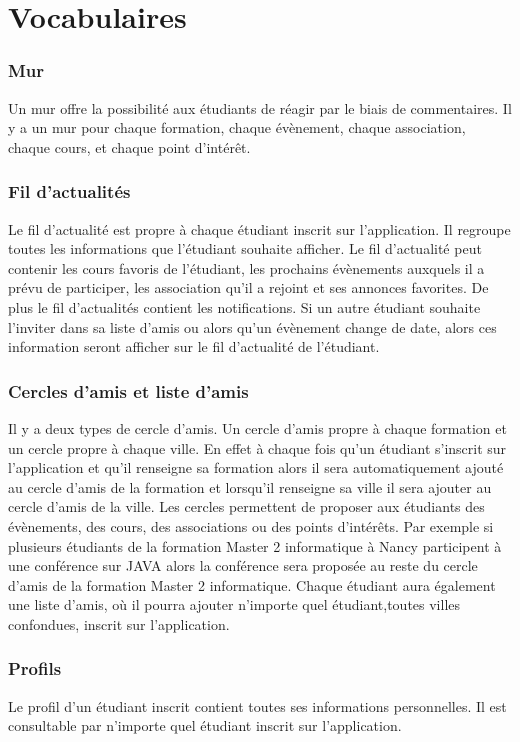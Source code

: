 \section*{Vocabulaires}
\subsubsection*{Mur}
Un mur offre la possibilité aux étudiants de réagir par le biais de commentaires. Il y a un mur pour chaque formation, chaque évènement, chaque association, chaque cours, et chaque point d’intérêt. 
\subsubsection*{Fil d’actualités}
Le fil d’actualité est propre à chaque étudiant inscrit sur l'application. Il regroupe toutes les informations que l’étudiant souhaite afficher. Le fil d’actualité peut contenir les cours favoris de l'étudiant, les prochains évènements auxquels il a prévu de participer, les association qu’il a rejoint et ses annonces favorites. De plus le fil d’actualités contient les notifications. Si un autre étudiant souhaite l’inviter dans sa liste d’amis ou alors qu’un évènement change de date, alors ces information seront afficher sur le fil d’actualité de l’étudiant. 
\subsubsection*{Cercles d’amis et liste d’amis}
Il y a deux types de cercle d’amis. Un cercle d’amis propre à chaque formation et un cercle propre à chaque ville. En effet à chaque fois qu’un étudiant s’inscrit sur l'application et qu’il renseigne sa formation alors il sera automatiquement ajouté au cercle d’amis de la formation et lorsqu’il renseigne sa ville il sera ajouter au cercle d’amis de la ville. Les cercles permettent de proposer aux étudiants des évènements, des cours, des associations ou des points d’intérêts. Par exemple si plusieurs étudiants de la formation Master 2 informatique à Nancy participent à une conférence sur JAVA alors la conférence sera proposée au reste du cercle d’amis de la formation Master 2 informatique. 
Chaque étudiant aura également une liste d’amis, où il pourra ajouter n’importe quel étudiant,toutes villes confondues,  inscrit sur l'application.
\subsubsection*{Profils}
Le profil d’un étudiant inscrit contient toutes ses informations personnelles. Il est consultable par n’importe quel étudiant inscrit sur l'application. 